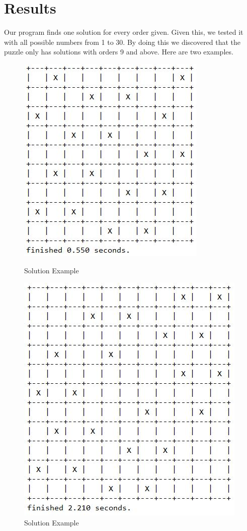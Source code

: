 \documentclass[runningheads]{llncs}
\begin{document}
\section{Results}
Our program finds one solution for every order given. Given this, we tested it with all possible numbers from 1 to 30.
By doing this we discovered that the puzzle only has solutions with orders 9 and above. Here are two examples.
\begin{figure}
    \begin{center}
        \includegraphics[scale=0.5]{images/gap9.jpg}
        \caption{Solution Example} \label{fig3}
    \end{center}
    \begin{center}
        \includegraphics[scale=0.5]{images/gap11.jpg}
        \caption{Solution Example} \label{fig4}
    \end{center}
\end{figure}
\end{document}

